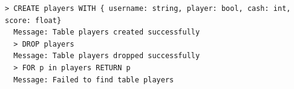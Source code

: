 \documentclass[12pt,onecolumn]{article}
\begin{document}
\begin{lstlisting}[style=bash]
  > CREATE players WITH { username: string, player: bool, cash: int, score: float}                                                             
  Message: Table players created successfully                                                                                                  
  > DROP players                                                                                                                               
  Message: Table players dropped successfully                                                                                                  
  > FOR p in players RETURN p                                                                                                                  
  Message: Failed to find table players  
\end{lstlisting}
\end{document}
